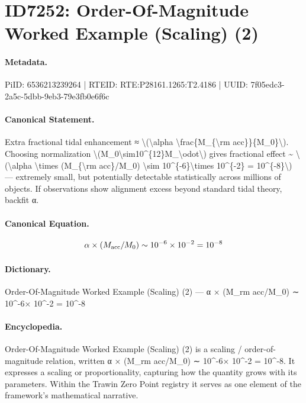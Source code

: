 \section*{ID7252: Order-Of-Magnitude Worked Example (Scaling) (2)}
\paragraph{Metadata.}
PiID: 6536213239264 | RTEID: RTE:P28161.1265:T2.4186 | UUID: 7f05edc3-2a5c-5dbb-9eb3-79e3fb0e6f6c

\paragraph{Canonical Statement.}
Extra fractional tidal enhancement ≈ \textbackslash{}(\textbackslash{}alpha \textbackslash{}frac\{M\_\{\textbackslash{}rm acc\}\}\{M\_0\}\textbackslash{}). Choosing normalization \textbackslash{}(M\_0\textbackslash{}sim10\textasciicircum{}\{12\}M\_\textbackslash{}odot\textbackslash{}) gives fractional effect \textasciitilde{} \textbackslash{}(\textbackslash{}alpha \textbackslash{}times (M\_\{\textbackslash{}rm acc\}/M\_0) \textbackslash{}sim 10\textasciicircum{}\{-6\}\textbackslash{}times 10\textasciicircum{}\{-2\} = 10\textasciicircum{}\{-8\}\textbackslash{}) — extremely small, but potentially detectable statistically across millions of objects. If observations show alignment excess beyond standard tidal theory, backfit α.

\paragraph{Canonical Equation.}
\[
\alpha \times (M_{\rm acc}/M_0) \sim 10^{-6}\times 10^{-2} = 10^{-8}
\]

\paragraph{Dictionary.}
Order-Of-Magnitude Worked Example (Scaling) (2) — α × (M\_rm acc/M\_0) ∼ 10\textasciicircum{}-6× 10\textasciicircum{}-2 = 10\textasciicircum{}-8

\paragraph{Encyclopedia.}
Order-Of-Magnitude Worked Example (Scaling) (2) is a scaling / order-of-magnitude relation, written α × (M\_rm acc/M\_0) ∼ 10\textasciicircum{}-6× 10\textasciicircum{}-2 = 10\textasciicircum{}-8. It expresses a scaling or proportionality, capturing how the quantity grows with its parameters. Within the Trawin Zero Point registry it serves as one element of the framework's mathematical narrative.

